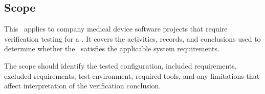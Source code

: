 \subsection{Scope}
This \stdRptPkg\ applies to \Gls{company} medical device software projects that
require verification testing for a \stdCfgItem.  It covers the activities,
records, and conclusions used to determine whether the \stdCfgItem\ satisfies
the applicable system requirements.

\tlcVspace

The scope should identify the tested configuration, included requirements,
excluded requirements, test environment, required tools, and any limitations that
affect interpretation of the verification conclusion.
